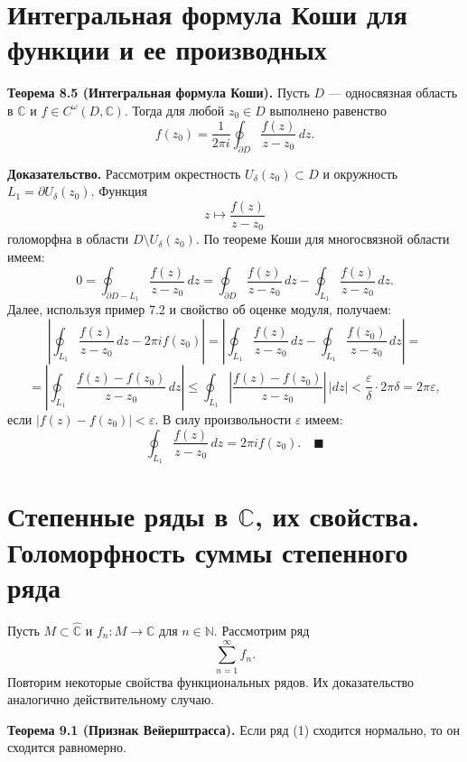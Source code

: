 \documentclass[12pt, a4paper]{article}
\theoremstyle{definition}
\theoremstyle{remark}
\begin{document}
\newpage
\section{Интегральная формула Коши для функции и ее производных}
\textbf{Теорема 8.5 (Интегральная формула Коши).} Пусть $D$ — односвязная область в $\mathbb{C}$ и $f \in C^{\omega}(D, \mathbb{C})$. Тогда для любой $z_0 \in D$ выполнено равенство
\begin{equation}
	f(z_0) = \frac{1}{2\pi i} \oint_{\partial D} \frac{f(z)}{z - z_0} \, dz.
\end{equation}

\textbf{Доказательство.} Рассмотрим окрестность $U_{\delta}(z_0) \subset D$ и окружность $L_1 = \partial U_{\delta}(z_0)$. Функция 
\[
z \mapsto \frac{f(z)}{z - z_0}
\]
голоморфна в области $D \setminus U_{\delta}(z_0)$. По теореме Коши для многосвязной области имеем:
\[
0 = \oint_{\partial D - L_1} \frac{f(z)}{z - z_0} \, dz = \oint_{\partial D} \frac{f(z)}{z - z_0} \, dz - \oint_{L_1} \frac{f(z)}{z - z_0} \, dz.
\]
Далее, используя пример 7.2 и свойство об оценке модуля, получаем:
\[
\left| \oint_{L_1} \frac{f(z)}{z - z_0} \, dz - 2\pi i f(z_0) \right| = \left| \oint_{L_1} \frac{f(z)}{z - z_0} \, dz - \oint_{L_1} \frac{f(z_0)}{z - z_0} \, dz \right| =
\]
\[
= \left| \oint_{L_1} \frac{f(z) - f(z_0)}{z - z_0} \, dz \right| \le \oint_{L_1} \left| \frac{f(z) - f(z_0)}{z - z_0} \right| \, |dz| < \frac{\varepsilon}{\delta} \cdot 2\pi\delta = 2\pi\varepsilon,
\]
если $|f(z) - f(z_0)| < \varepsilon$. В силу произвольности $\varepsilon$ имеем:
\[
\oint_{L_1} \frac{f(z)}{z - z_0} \, dz = 2\pi i f(z_0). \quad \blacksquare
\]

\newpage
\section{Степенные ряды в $\mathbb{C}$, их свойства. Голоморфность суммы степенного ряда}

Пусть $M \subset \hat{\mathbb{C}}$ и $f_n : M \to \mathbb{C}$ для $n \in \mathbb{N}$. Рассмотрим ряд
\begin{equation}
	\sum_{n=1}^{\infty} f_n.
\end{equation}
Повторим некоторые свойства функциональных рядов. Их доказательство аналогично действительному случаю.

\textbf{Теорема 9.1 (Признак Вейерштрасса).} Если ряд (1) сходится нормально, то он сходится равномерно.
\end{document}
